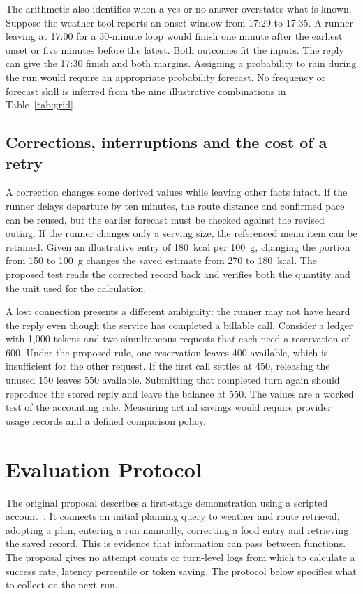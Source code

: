 \documentclass[conference]{IEEEtran}
\begin{document}
The arithmetic also identifies when a yes-or-no answer overstates what is known. Suppose the weather tool reports an onset window from 17:29 to 17:35. A runner leaving at 17:00 for a 30-minute loop would finish one minute after the earliest onset or five minutes before the latest. Both outcomes fit the inputs. The reply can give the 17:30 finish and both margins. Assigning a probability to rain during the run would require an appropriate probability forecast. No frequency or forecast skill is inferred from the nine illustrative combinations in Table~\ref{tab:grid}.

\subsection{Corrections, interruptions and the cost of a retry}
A correction changes some derived values while leaving other facts intact. If the runner delays departure by ten minutes, the route distance and confirmed pace can be reused, but the earlier forecast must be checked against the revised outing. If the runner changes only a serving size, the referenced menu item can be retained. Given an illustrative entry of 180~kcal per 100~g, changing the portion from 150 to 100~g changes the saved estimate from 270 to 180~kcal. The proposed test reads the corrected record back and verifies both the quantity and the unit used for the calculation.

A lost connection presents a different ambiguity: the runner may not have heard the reply even though the service has completed a billable call. Consider a ledger with 1,000 tokens and two simultaneous requests that each need a reservation of 600. Under the proposed rule, one reservation leaves 400 available, which is insufficient for the other request. If the first call settles at 450, releasing the unused 150 leaves 550 available. Submitting that completed turn again should reproduce the stored reply and leave the balance at 550. The values are a worked test of the accounting rule. Measuring actual savings would require provider usage records and a defined comparison policy.

\section{Evaluation Protocol}
The original proposal describes a first-stage demonstration using a scripted account~\cite{proposal,project}. It connects an initial planning query to weather and route retrieval, adopting a plan, entering a run manually, correcting a food entry and retrieving the saved record. This is evidence that information can pass between functions. The proposal gives no attempt counts or turn-level logs from which to calculate a success rate, latency percentile or token saving. The protocol below specifies what to collect on the next run.
\end{document}
